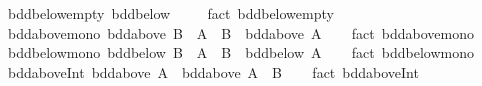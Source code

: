 \begin{isabellebody}
\ bdd{\isacharunderscore}{\kern0pt}below{\isacharunderscore}{\kern0pt}empty{\isacharcolon}{\kern0pt}\ {\isachardoublequoteopen}bdd{\isacharunderscore}{\kern0pt}below\ {\isacharbraceleft}{\kern0pt}{\isacharbraceright}{\kern0pt}{\isachardoublequoteclose}\isanewline
%
\isadelimproof
\ \ %
\endisadelimproof
%
\isatagproof
{}\isamarkupfalse%
\ {\isacharparenleft}{\kern0pt}fact\ bdd{\isacharunderscore}{\kern0pt}below{\isachardot}{\kern0pt}empty{\isacharparenright}{\kern0pt}%
\endisatagproof
{\isafoldproof}%
%
\isadelimproof
\isanewline
%
\endisadelimproof
\isanewline
{}\isamarkupfalse%
\ bdd{\isacharunderscore}{\kern0pt}above{\isacharunderscore}{\kern0pt}mono{\isacharcolon}{\kern0pt}\ {\isachardoublequoteopen}bdd{\isacharunderscore}{\kern0pt}above\ B\ {\isasymLongrightarrow}\ A\ {\isasymsubseteq}\ B\ {\isasymLongrightarrow}\ bdd{\isacharunderscore}{\kern0pt}above\ A{\isachardoublequoteclose}\isanewline
%
\isadelimproof
\ \ %
\endisadelimproof
%
\isatagproof
{}\isamarkupfalse%
\ {\isacharparenleft}{\kern0pt}fact\ bdd{\isacharunderscore}{\kern0pt}above{\isachardot}{\kern0pt}mono{\isacharparenright}{\kern0pt}%
\endisatagproof
{\isafoldproof}%
%
\isadelimproof
\isanewline
%
\endisadelimproof
\isanewline
{}\isamarkupfalse%
\ bdd{\isacharunderscore}{\kern0pt}below{\isacharunderscore}{\kern0pt}mono{\isacharcolon}{\kern0pt}\ {\isachardoublequoteopen}bdd{\isacharunderscore}{\kern0pt}below\ B\ {\isasymLongrightarrow}\ A\ {\isasymsubseteq}\ B\ {\isasymLongrightarrow}\ bdd{\isacharunderscore}{\kern0pt}below\ A{\isachardoublequoteclose}\isanewline
%
\isadelimproof
\ \ %
\endisadelimproof
%
\isatagproof
{}\isamarkupfalse%
\ {\isacharparenleft}{\kern0pt}fact\ bdd{\isacharunderscore}{\kern0pt}below{\isachardot}{\kern0pt}mono{\isacharparenright}{\kern0pt}%
\endisatagproof
{\isafoldproof}%
%
\isadelimproof
\isanewline
%
\endisadelimproof
\isanewline
{}\isamarkupfalse%
\ bdd{\isacharunderscore}{\kern0pt}above{\isacharunderscore}{\kern0pt}Int{}{\isacharcolon}{\kern0pt}\ {\isachardoublequoteopen}bdd{\isacharunderscore}{\kern0pt}above\ A\ {\isasymLongrightarrow}\ bdd{\isacharunderscore}{\kern0pt}above\ {\isacharparenleft}{\kern0pt}A\ {\isasyminter}\ B{\isacharparenright}{\kern0pt}{\isachardoublequoteclose}\isanewline
%
\isadelimproof
\ \ %
\endisadelimproof
%
\isatagproof
{}\isamarkupfalse%
\ {\isacharparenleft}{\kern0pt}fact\ bdd{\isacharunderscore}{\kern0pt}above{\isachardot}{\kern0pt}Int{}{\isacharparenright}{\kern0pt}%
\endisatagproof
{\isafoldproof}%
%
\isadelimproof

\end{isabellebody}
